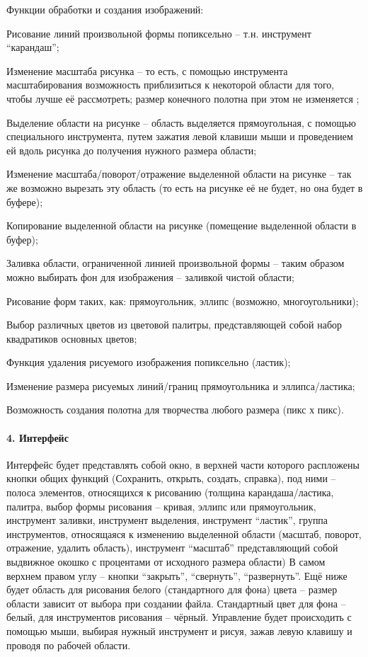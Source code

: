 Функции обработки и создания изображений\+:
\begin{DoxyItemize}
\item Рисование линий произвольной формы попиксельно – т.\+н. инструмент “карандаш”;
\item Изменение масштаба рисунка – то есть, с помощью инструмента масштабирования возможность приблизиться к некоторой области для того, чтобы лучше её рассмотреть; размер конечного полотна при этом не изменяется ;
\item Выделение области на рисунке – область выделяется прямоугольная, с помощью специального инструмента, путем зажатия левой клавиши мыши и проведением ей вдоль рисунка до получения нужного размера области;
\item Изменение масштаба/поворот/отражение выделенной области на рисунке – так же возможно вырезать эту область (то есть на рисунке её не будет, но она будет в буфере);
\item Копирование выделенной области на рисунке (помещение выделенной области в буфер);
\item Заливка области, ограниченной линией произвольной формы – таким образом можно выбирать фон для изображения – заливкой чистой области;
\item Рисование форм таких, как\+: прямоугольник, эллипс (возможно, многоугольники);
\item Выбор различных цветов из цветовой палитры, представляющей собой набор квадратиков основных цветов;
\item Функция удаления рисуемого изображения попиксельно (ластик);
\item Изменение размера рисуемых линий/границ прямоугольника и эллипса/ластика;
\item Возможность создания полотна для творчества любого размера (пикс х пикс).
\end{DoxyItemize}

\paragraph*{4. Интерфейс}

Интерфейс будет представлять собой окно, в верхней части которого распложены кнопки общих функций (Сохранить, открыть, создать, справка), под ними – полоса элементов, относящихся к рисованию (толщина карандаша/ластика, палитра, выбор формы рисования – кривая, эллипс или прямоугольник, инструмент заливки, инструмент выделения, инструмент “ластик”, группа инструментов, относящаяся к изменению выделенной области (масштаб, поворот, отражение, удалить область), инструмент “масштаб” представляющий собой выдвижное окошко с процентами от исходного размера области) В самом верхнем правом углу – кнопки “закрыть”, “свернуть”, “развернуть”. Ещё ниже будет область для рисования белого (стандартного для фона) цвета – размер области зависит от выбора при создании файла. Стандартный цвет для фона – белый, для инструментов рисования – чёрный. Управление будет происходить с помощью мыши, выбирая нужный инструмент и рисуя, зажав левую клавишу и проводя по рабочей области. 